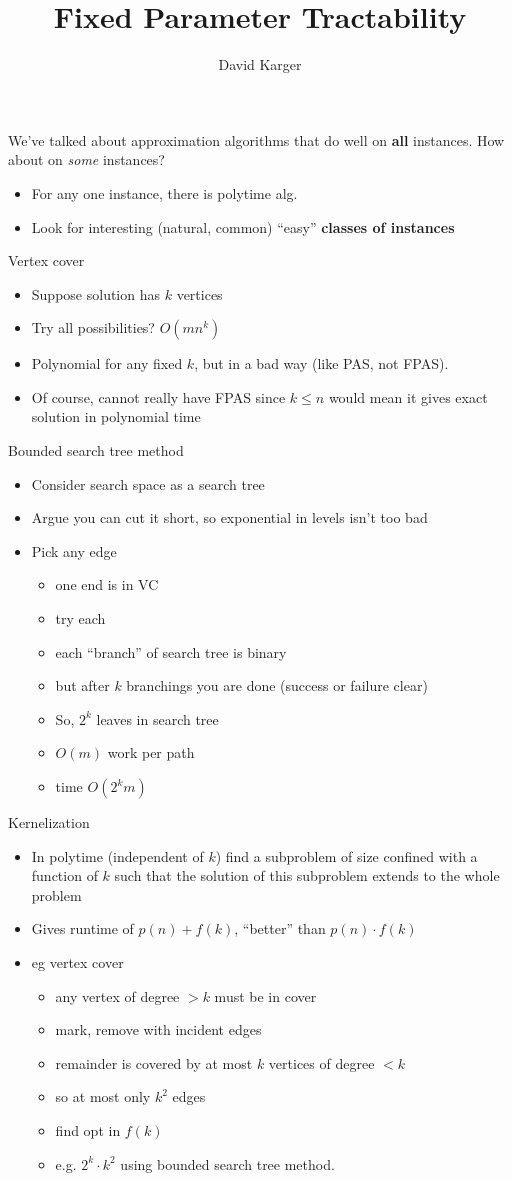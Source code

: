 \documentclass{article}
\title{Fixed Parameter Tractability}
\author{David Karger}
\begin{document}
We've talked about approximation algorithms that do well on \textbf{all}
instances.  How about on \emph{some} instances?
\begin{itemize}
\item For any one instance, there is polytime alg.
\item Look for interesting (natural, common) ``easy'' \bf{classes} of
instances
\end{itemize}

Vertex cover
\begin{itemize}
\item Suppose solution has $k$ vertices
\item Try all possibilities?  $O(mn^k)$
\item Polynomial for any fixed $k$, but in a bad way (like PAS, not
  FPAS).
\item Of course, cannot really have FPAS since $k \leq n$ would mean it
  gives exact solution in polynomial time
\end{itemize}

Bounded search tree method
\begin{itemize}
\item Consider search space as a search tree
\item Argue you can cut it short, so exponential in levels isn't too bad
\item Pick any edge
\begin{itemize}
\item one end is in VC
\item try each
\item each ``branch'' of search tree is binary
\item but after $k$ branchings you are done (success or failure clear)
\item So, $2^k$ leaves in search tree
\item $O(m)$ work per path
\item time $O(2^k m)$
\end{itemize}
\end{itemize}

Kernelization
\begin{itemize}
\item In polytime (independent of $k$) find a subproblem of size confined with a function of $k$ such that the
  solution of this subproblem extends to the whole problem
\item Gives runtime of $p(n)+f(k)$, ``better'' than $p(n)\cdot f(k)$
\item eg vertex cover
\begin{itemize}
\item any vertex of degree $>k$ must be in cover
\item mark, remove with incident edges
\item remainder is covered by at most $k$ vertices of degree $<k$
\item so at most only $k^2$ edges
\item find opt in $f(k)$
\item e.g. $2^k \cdot k^2$ using bounded search tree method.
\end{itemize}
\end{itemize}
\end{document}

